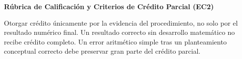 \documentclass[11pt, a4paper, landscape]{article}
\begin{document}
\begin{center}
    \Large\textbf{\textcolor{ucbblue}{Rúbrica de Calificación y Criterios de Crédito Parcial (EC2)}}\\[0.2cm]
\end{center}

\begin{tcolorbox}[colback=white, colframe=black, title=\textbf{Principio General de Calificación}, left=1mm, right=1mm, top=1mm, bottom=1mm]
    Otorgar crédito únicamente por la evidencia del procedimiento, no solo por el resultado numérico final. Un resultado correcto sin desarrollo matemático no recibe crédito completo. Un error aritmético simple tras un planteamiento conceptual correcto debe preservar gran parte del crédito parcial.
\end{tcolorbox}
\end{document}
